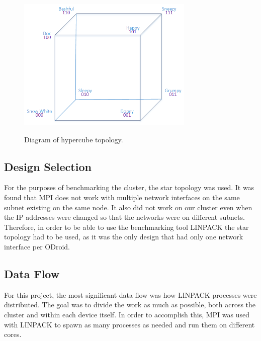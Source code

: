 \begin{figure}[tbh]
	\caption{Diagram of hypercube topology.}
	\centering
		\includegraphics[width=0.75\textwidth]{HyperCube2.png}
	\label{fig:hypercube}
\end{figure}


 \subsection{Design Selection}
	For the purposes of benchmarking the cluster, the star topology was used. It was found that MPI does not work with multiple network interfaces on the same subnet existing on the same node. It also did not work on our cluster even when the IP addresses were changed so that the networks were on different subnets. Therefore, in order to be able to use the benchmarking tool LINPACK the star topology had to be used, as it was the only design that had only one network interface per ODroid.
 
	

 \subsection{Data Flow}
	For this project, the most significant data flow was how LINPACK processes were distributed. The goal was to divide the work as much as possible, both across the cluster and within each device itself. In order to accomplish this, MPI was used with LINPACK to spawn as many processes as needed and run them on different cores. 
 
